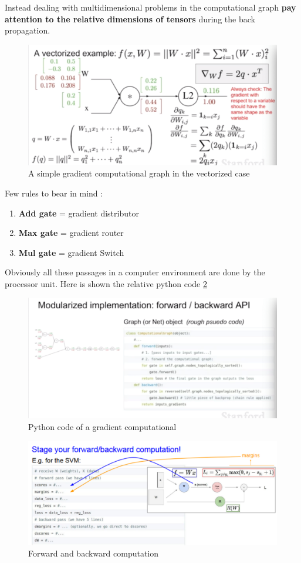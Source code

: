\documentclass[11pt]{article}
\begin{document}
Instead dealing with multidimensional problems in the computational graph \textbf{pay attention to the relative dimensions of tensors} during the back propagation.
\begin{figure}[h]
\centering
\captionsetup{justification=centering}
\includegraphics[width=0.7\linewidth]{L312.pdf}
\caption{ A simple gradient computational graph in the vectorized case}
\label{fig:L312}
\end{figure}

Few rules to bear in mind :

\begin{enumerate}
    \item \textbf{Add gate} = gradient distributor
    \item \textbf{Max gate} = gradient router
    \item \textbf{Mul gate} = gradient Switch
\end{enumerate}{}
Obviously all these passages in a computer environment are done by the processor unit. 
Here is shown the relative python code \ref{fig:L313}
\begin{figure}[h]
\centering
\captionsetup{justification=centering}
\includegraphics[width=1\linewidth]{L313.pdf}
\caption{ Python code of a gradient computational }
\label{fig:L313}
\end{figure}
\clearpage
\begin{figure}[h]
\centering
\captionsetup{justification=centering}
\includegraphics[width=1\linewidth]{L314.pdf}
\caption{ Forward and backward computation}
\label{fig:L314}
\end{figure}
\end{document}
